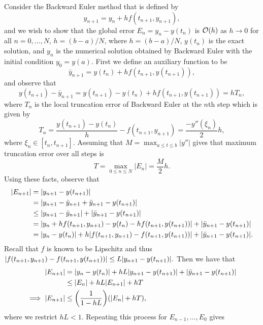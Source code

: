 \documentclass[12pt]{report}
\begin{document}
\begin{solution}

    \noindent
    Consider the Backward Euler method that is defined by
    \[ 
        y_{n+1} = y_n + hf(t_{n+1},y_{n+1}),
    \]
    and we wish to show that the global error $E_n = y_n-y(t_n)$ is ${\mathcal{O}}(h)$ as $h \to 0$ for all $n = 0, \dots, N$, $h = (b - a)/N$, where $h = (b - a)/N$, $y(t_n)$ is the exact solution, and $y_n$ is the numerical solution obtained by Backward Euler with the initial condition $y_0 = y(a)$. First we define an auxiliary function to be
    \[ 
        \bar{y}_{n+1} = y(t_n) + hf(t_{n+1},y(t_{n+1})),
    \]
    and observe that
    \[ 
        y(t_{n+1}) - \bar{y}_{n+1} = y(t_{n+1}) -y(t_n) + hf(t_{n+1},y(t_{n+1})) = h T_n,
    \] 
    where $T_n$ is the local truncation error of Backward Euler at the $n$th step which is given by
    \[ 
        T_n = \frac{y(t_{n+1}) - y(t_n)}{h} - f(t_{n+1}, y_{n+1}) = \frac{-y''(\xi_n)}{2}h,
    \]
    where $\xi_n \in [t_n, t_{n+1}]$. Assuming that $M = \max_{a \leq t \leq b}|y''|$ gives that maximum truncation error over all steps is
    \[ 
        T = \max_{0 \leq n \leq N}|E_n| = \frac{M}{2}h.
    \]
    Using these facts, observe that
    \begin{align*}
        |E_{n+1}| &= |y_{n+1} - y(t_{n+1})|\\
        &= {\left| y_{n+1} - \bar{y}_{n+1} + \bar{y}_{n+1} - y(t_{n+1}) \right|}\\
        &\leq {\left|y_{n+1} - \bar{y}_{n+1}\right|} + {\left|\bar{y}_{n+1} - y(t_{n+1})\right|}\\
        &= {\left|y_n + hf(t_{n+1},y_{n+1}) - y(t_n) - hf(t_{n+1},y(t_{n+1}))\right|} + {\left|\bar{y}_{n+1} - y(t_{n+1})\right|}\\
        &= {\left|y_n - y(t_n)\right|} + h{\left|f(t_{n+1},y_{n+1}) - f(t_{n+1},y(t_{n+1}))\right|} + {\left|\bar{y}_{n+1} - y(t_{n+1})\right|}.
    \end{align*}
    Recall that $f$ is known to be Lipschitz and thus ${\left|f(t_{n+1},y_{n+1}) - f(t_{n+1},y(t_{n+1}))\right|} \leq L {\left|y_{n+1} - y(t_{n+1})\right|}.$ Then we have that
    \begin{align*}
        |E_{n+1}| &= {\left|y_n - y(t_n)\right|} + hL{\left|y_{n+1} - y(t_{n+1})\right|} + {\left|\bar{y}_{n+1} - y(t_{n+1})\right|}\\
        &\leq |E_n| + hL |E_{n+1}| + hT\\
        \implies |E_{n+1}| &\leq {\left(\frac{1}{1 - hL}\right)}{\left(|E_n| + hT\right)},
    \end{align*}
    where we restrict $hL < 1$. Repeating this process for $E_{n-1},\dots,E_{0}$ gives
    \begin{align*}

\end{align*}
\end{solution}
\end{document}
